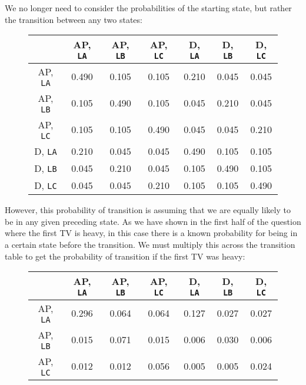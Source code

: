 \documentclass{article}
\begin{document}
\begin{enumerate}[start=0]
\begin{enumerate}
    We no longer need to consider the probabilities of the starting state, but
    rather the transition between any two states:
    \begin{figure}[H]
    \centering
    \begin{tabular}{|c||c|c|c|c|c|c|}
        \hline
            & AP, \texttt{LA} &
            AP, \texttt{LB}&
            AP, \texttt{LC}&
            D, \texttt{LA}&
            D, \texttt{LB}&
            D, \texttt{LC}\\\hline\hline
            AP, \texttt{LA}&
            0.490 & 0.105 & 0.105 & 0.210 & 0.045 & 0.045\\\hline
            AP, \texttt{LB}&
            0.105 & 0.490 & 0.105 & 0.045 & 0.210 & 0.045\\\hline
            AP, \texttt{LC}&
            0.105 & 0.105 & 0.490 & 0.045 & 0.045 & 0.210\\\hline
            D, \texttt{LA}&
            0.210 & 0.045 & 0.045 & 0.490 & 0.105 & 0.105\\\hline
            D, \texttt{LB}&
            0.045 & 0.210 & 0.045 & 0.105 & 0.490 & 0.105\\\hline
            D, \texttt{LC}&
            0.045 & 0.045 & 0.210 & 0.105 & 0.105 & 0.490\\\hline
    \end{tabular}
    \end{figure}
    However, this probability of transition is assuming that we are equally
    likely to be in any given preceding state. As we have shown in the first
    half of the question where the first TV is heavy, in this case there is a
    known probability for being in a certain state before the transition. We
    must multiply this across the transition table to get the probability of
    transition if the first TV was heavy:
    \begin{figure}[H]
    \centering
    \begin{tabular}{|c||c|c|c|c|c|c|}
        \hline
            & AP, \texttt{LA} &
            AP, \texttt{LB}&
            AP, \texttt{LC}&
            D, \texttt{LA}&
            D, \texttt{LB}&
            D, \texttt{LC}\\\hline\hline
            AP, \texttt{LA}&
            0.296 & 0.064 & 0.064 & 0.127 & 0.027 & 0.027 \\\hline
            AP, \texttt{LB}&
            0.015 & 0.071 & 0.015 & 0.006 & 0.030 & 0.006 \\\hline
            AP, \texttt{LC}&
            0.012 & 0.012 & 0.056 & 0.005 & 0.005 & 0.024 \\\hline

\end{tabular}
\end{figure}
\end{enumerate}
\end{enumerate}
\end{document}
